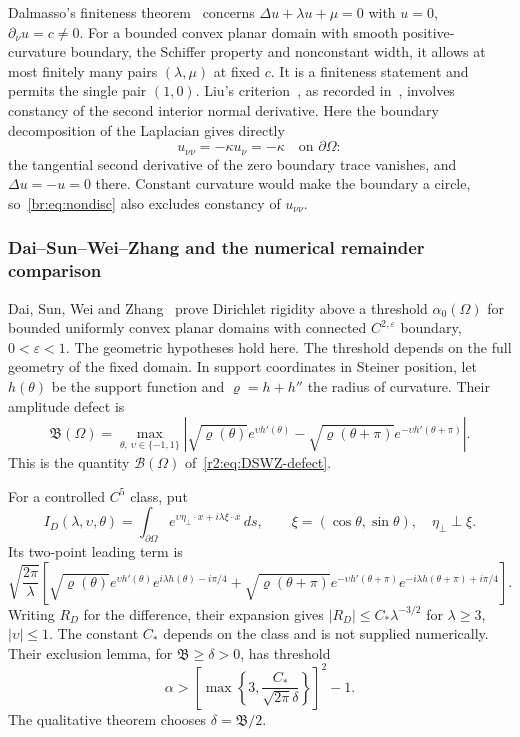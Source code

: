 Dalmasso's finiteness theorem~\cite[Theorem 1.1]{Dal10} concerns
$\Delta u+\lambda u+\mu=0$ with $u=0$, $\partial_\nu u=c\ne0$.
For a bounded convex planar domain with smooth positive-curvature
boundary, the Schiffer property and nonconstant width, it allows at
most finitely many pairs $(\lambda,\mu)$ at fixed $c$.
It is a finiteness statement and permits the single pair $(1,0)$.
Liu's criterion~\cite{Liu07}, as recorded in~\cite{CSS26,DSWZ25},
involves constancy of the second interior normal derivative.
Here the boundary decomposition of the Laplacian gives directly
\begin{equation}\label{br:eq:second-normal}
 u_{\nu\nu}=-\kappa u_\nu=-\kappa\quad\text{on }\partial\Omega:
\end{equation}
the tangential second derivative of the zero boundary trace vanishes,
and $\Delta u=-u=0$ there. Constant curvature would make the boundary
a circle, so~\eqref{br:eq:nondisc} also excludes constancy of
$u_{\nu\nu}$.

\subsubsection{Dai--Sun--Wei--Zhang and the numerical remainder comparison}
Dai, Sun, Wei and Zhang~\cite[Theorem 1.1, version 2]{DSWZ25} prove
Dirichlet rigidity above a threshold $\alpha_0(\Omega)$ for bounded
uniformly convex planar domains with connected $C^{2,\varepsilon}$
boundary, $0<\varepsilon<1$. The geometric hypotheses hold here.
The threshold depends on the full geometry of the fixed domain.
In support coordinates in Steiner position, let $h(\theta)$ be the
support function and $\varrho=h+h''$ the radius of curvature.
Their amplitude defect is
\begin{equation}\label{br:eq:DSWZ-defect}
 \mathfrak B(\Omega)=\max_{\theta,\,\upsilon\in\{-1,1\}}
 \left|\sqrt{\varrho(\theta)}e^{\upsilon h'(\theta)}
 -\sqrt{\varrho(\theta+\pi)}e^{-\upsilon h'(\theta+\pi)}\right|.
\end{equation}
This is the quantity $\mathcal B(\Omega)$ of~\eqref{r2:eq:DSWZ-defect}.

For a controlled $C^5$ class, put
\[
 I_D(\lambda,\upsilon,\theta)=\int_{\partial\Omega}
 e^{\upsilon\eta_\perp\cdot x+i\lambda\xi\cdot x}\,ds,
 \qquad \xi=(\cos\theta,\sin\theta),\quad\eta_\perp\perp\xi.
\]
Its two-point leading term is
\begin{equation}\label{br:eq:DSWZ-leading}
 \sqrt{\frac{2\pi}{\lambda}}\left[
 \sqrt{\varrho(\theta)}e^{\upsilon h'(\theta)}e^{i\lambda h(\theta)-i\pi/4}
 +\sqrt{\varrho(\theta+\pi)}e^{-\upsilon h'(\theta+\pi)}
                          e^{-i\lambda h(\theta+\pi)+i\pi/4}\right].
\end{equation}
Writing $R_D$ for the difference, their expansion gives
$|R_D|\le C_*\lambda^{-3/2}$ for $\lambda\ge3$, $|\upsilon|\le1$.
The constant $C_*$ depends on the class and is not supplied numerically.
Their exclusion lemma, for $\mathfrak B\ge\delta>0$, has threshold
\begin{equation}\label{br:eq:DSWZ-threshold}
 \alpha>\left[\max\left\{3,\frac{C_*}{\sqrt{2\pi}\delta}\right\}\right]^2-1.
\end{equation}
The qualitative theorem chooses $\delta=\mathfrak B/2$.


